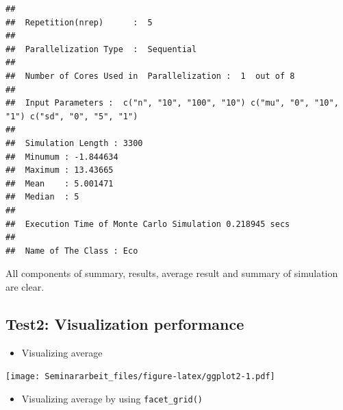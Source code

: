 \documentclass[11pt,a4paper]{article}
\newenvironment{Shaded}{\begin{snugshade}}{\end{snugshade}}
\newcommand{\AttributeTok}[1]{\textcolor[rgb]{0.77,0.63,0.00}{#1}}
\newcommand{\FunctionTok}[1]{\textcolor[rgb]{0.00,0.00,0.00}{#1}}
\newcommand{\NormalTok}[1]{#1}
\newcommand{\SpecialCharTok}[1]{\textcolor[rgb]{0.00,0.00,0.00}{#1}}
\begin{document}
\begin{verbatim}
## 
##  Repetition(nrep)      :  5 
## 
##  Parallelization Type  :  Sequential 
## 
##  Number of Cores Used in  Parallelization :  1  out of 8 
## 
##  Input Parameters :  c("n", "10", "100", "10") c("mu", "0", "10", "1") c("sd", "0", "5", "1") 
## 
##  Simulation Length : 3300 
##  Minumum : -1.844634 
##  Maximum : 13.43665 
##  Mean    : 5.001471 
##  Median  : 5 
## 
##  Execution Time of Monte Carlo Simulation 0.218945 secs 
## 
##  Name of The Class : Eco
\end{verbatim}

All components of summary, results, average result and summary of
simulation are clear.

\hypertarget{test2-visualization-performance}{%
\subsection{Test2: Visualization
performance}\label{test2-visualization-performance}}

\begin{itemize}

\item
  Visualizing average
\end{itemize}

\begin{Shaded}
\end{Shaded}

\texttt{[image: Seminararbeit\_files/figure-latex/ggplot2-1.pdf]}

\begin{itemize}

\item
  Visualizing average by using \texttt{facet\_grid()}
\end{itemize}

\begin{Shaded}
\end{Shaded}
\end{document}
